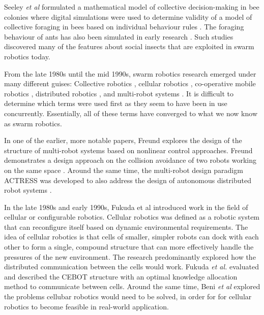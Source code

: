 Seeley \textit{et al }\cite{seeley1991collective} formulated a mathematical model of collective decision-making in bee colonies where digital simulations were used to determine validity of a model of collective foraging in bees based on individual behaviour rules \cite{de1998modelling}. The foraging behaviour of ants has also been simulated in early research \cite{lopez1987optimal}. Such studies discovered many of the features about social insects that are exploited in swarm robotics today.

From the late 1980s until the mid 1990s, swarm robotics research emerged under many different guises: Collective robotics \cite{kube1993collective}, cellular robotics \cite{freund1984design}, co-operative mobile robotics \cite{cao1997cooperative}, distributed robotics \cite{asama2013distributed}, and multi-robot systems \cite{mataric1995cooperative}. It is difficult to determine which terms were used first as they seem to have been in use concurrently. Essentially, all of these terms have converged to what we now know as swarm robotics.

In one of the earlier, more notable papers, Freund explores the design of the structure of multi-robot systems based on nonlinear control approaches. Freund demonstrates a design approach on the collision avoidance of two robots working on the same space \cite{freund1984design,freund1986pathfinding}. Around the same time, the multi-robot design paradigm ACTRESS was developed to also address the design of autonomous distributed robot systems \cite{asama1989design}. 

In the late 1980s and early 1990s, Fukuda et al \cite{fukuda1989communication, fukuda1990analysis} introduced work in the field of cellular or configurable robotics. Cellular robotics was defined as a robotic system that can reconfigure itself based on dynamic environmental requirements. The idea of cellular robotics is that cells of smaller, simpler robots can dock with each other to form a single, compound structure that can more effectively handle the pressures of the new environment. The research predominantly explored how the distributed communication between the cells would work. Fukuda \textit{et al.} evaluated and described the CEBOT structure with an optimal knowledge allocation method to communicate between cells. Around the same time, Beni \textit{et al} \cite{beni1991theoretical} explored the problems cellubar robotics would need to be solved, in order for for cellular robotics to become feasible in real-world application.

